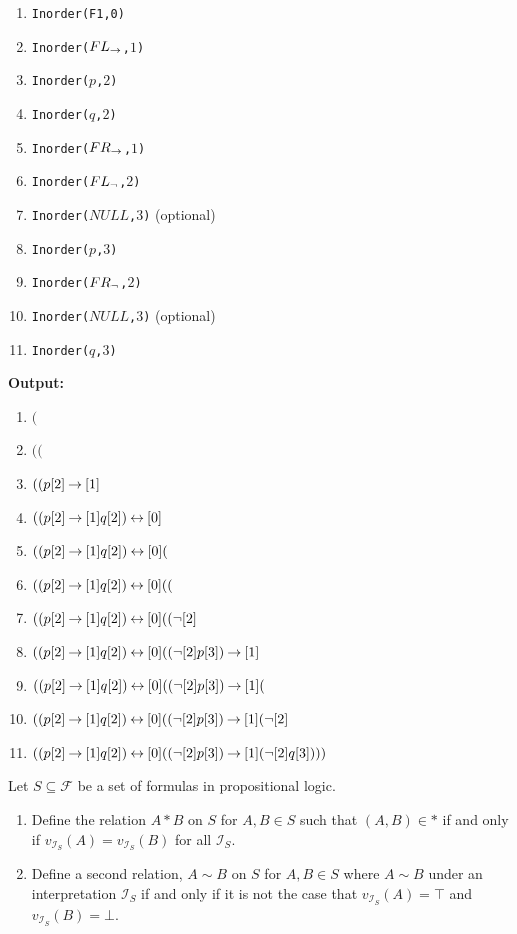 \documentclass[]{exam}
\begin{document}
\begin{questions}
\begin{solution}
\begin{multicols}{2}
\begin{enumerate}
\item \texttt{Inorder(F1,0)}
\item \texttt{Inorder($FL_{\mathbin{\rightarrow}}$,$1$)}
\item \texttt{Inorder($p$,$2$)}
\item \texttt{Inorder($q$,$2$)}
\item \texttt{Inorder($FR_{\mathbin{\rightarrow}}$,$1$)}
\item \texttt{Inorder($FL_{\mathop{\neg}}$,$2$)}
\item \texttt{Inorder($NULL$,$3$)} (optional) 
\item \texttt{Inorder($p$,$3$)}
\item \texttt{Inorder($FR_{\mathop{\neg}}$,$2$)}
\item \texttt{Inorder($NULL$,$3$)} (optional) 
\item \texttt{Inorder($q$,$3$)}
\end{enumerate}
\columnbreak
{ \bf Output:}
\begin{enumerate}
\item $($
\item $(($
\item $((p[2] \mathbin{\rightarrow}[1]$
\item $((p[2] \mathbin{\rightarrow}[1] q[2]) \mathbin{\leftrightarrow}[0] $
\item $((p[2] \mathbin{\rightarrow}[1] q[2]) \mathbin{\leftrightarrow}[0] ($
\item $((p[2] \mathbin{\rightarrow}[1] q[2]) \mathbin{\leftrightarrow}[0] (($
\item $((p[2] \mathbin{\rightarrow}[1] q[2]) \mathbin{\leftrightarrow}[0] ((\mathop{\neg} [2]$
\item $((p[2] \mathbin{\rightarrow}[1] q[2]) \mathbin{\leftrightarrow}[0] ((\mathop{\neg} [2] p[3]) \mathbin{\rightarrow} [1] $
\item $((p[2] \mathbin{\rightarrow}[1] q[2]) \mathbin{\leftrightarrow}[0] ((\mathop{\neg} [2] p[3]) \mathbin{\rightarrow} [1] ($
\item $((p[2] \mathbin{\rightarrow}[1] q[2]) \mathbin{\leftrightarrow}[0] ((\mathop{\neg} [2] p[3]) \mathbin{\rightarrow} [1] (\mathop{\neg} [2] $
\item $((p[2] \mathbin{\rightarrow}[1] q[2]) \mathbin{\leftrightarrow}[0] ((\mathop{\neg} [2] p[3]) \mathbin{\rightarrow} [1] (\mathop{\neg} [2] q[3])))$
\end{enumerate}

\end{multicols}

\end{solution}
\question Let $S \subseteq \mathcal{F}$ be a set of formulas in propositional logic.
\begin{enumerate}
\item Define the relation $A*B$ on $S$ for $A,B \in S$ such that $(A,B) \in *$ if and
only if $v_{\mathcal{I}_S}(A) = v_{\mathcal{I}_S}(B)$ for all $\mathcal{I}_S$.
\item Define a second relation, $A\sim B$ on $S$ for $A,B \in S$ where $A\sim B$ under
an interpretation $\mathcal{I}_S$ if and only if it is not the case that
$v_{\mathcal{I}_S}(A) = \top$ and $v_{\mathcal{I}_S}(B) = \bot$.
\end{enumerate}


\end{questions}
\end{document}
